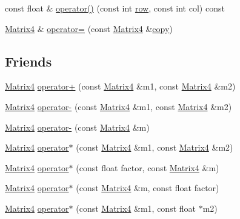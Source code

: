 \begin{DoxyCompactItemize}
\item 
const float \& \hyperlink{classprism_1_1_matrix4_a2e80dc870b4b71f06c8bb97ef7d22d90}{operator()} (const int \hyperlink{classprism_1_1_matrix4_a3915b1b0eae6e7bd4aefcec1dd3d863a}{row}, const int col) const 
\item 
\hyperlink{classprism_1_1_matrix4}{Matrix4} \& \hyperlink{classprism_1_1_matrix4_aa31f05b184217ef3ab902d6aa469500d}{operator=} (const \hyperlink{classprism_1_1_matrix4}{Matrix4} \&\hyperlink{namespaceprism_ae776f4cd825f79e7af1cf6ee1d90a209}{copy})
\end{DoxyCompactItemize}
\subsection*{Friends}
\begin{DoxyCompactItemize}
\item 
\hyperlink{classprism_1_1_matrix4}{Matrix4} \hyperlink{classprism_1_1_matrix4_afc2bce19b13471f0cac1a48c2932af60}{operator+} (const \hyperlink{classprism_1_1_matrix4}{Matrix4} \&m1, const \hyperlink{classprism_1_1_matrix4}{Matrix4} \&m2)
\item 
\hyperlink{classprism_1_1_matrix4}{Matrix4} \hyperlink{classprism_1_1_matrix4_a2e7720348e3d34cad4119b93c499971e}{operator-\/} (const \hyperlink{classprism_1_1_matrix4}{Matrix4} \&m1, const \hyperlink{classprism_1_1_matrix4}{Matrix4} \&m2)
\item 
\hyperlink{classprism_1_1_matrix4}{Matrix4} \hyperlink{classprism_1_1_matrix4_a9d189e964a989207c8489e80276dadd4}{operator-\/} (const \hyperlink{classprism_1_1_matrix4}{Matrix4} \&m)
\item 
\hyperlink{classprism_1_1_matrix4}{Matrix4} \hyperlink{classprism_1_1_matrix4_af33d4af5371e50d645cd647e02912f28}{operator$\ast$} (const \hyperlink{classprism_1_1_matrix4}{Matrix4} \&m1, const \hyperlink{classprism_1_1_matrix4}{Matrix4} \&m2)
\item 
\hyperlink{classprism_1_1_matrix4}{Matrix4} \hyperlink{classprism_1_1_matrix4_aefe58d9157e2f7ac266b357a5db4e986}{operator$\ast$} (const float factor, const \hyperlink{classprism_1_1_matrix4}{Matrix4} \&m)
\item 
\hyperlink{classprism_1_1_matrix4}{Matrix4} \hyperlink{classprism_1_1_matrix4_aeec24c93fae98db6ade9c1dd738ef3e7}{operator$\ast$} (const \hyperlink{classprism_1_1_matrix4}{Matrix4} \&m, const float factor)
\item 
\hyperlink{classprism_1_1_matrix4}{Matrix4} \hyperlink{classprism_1_1_matrix4_a023b29b55ee669aa94f8bbc9131923ce}{operator$\ast$} (const \hyperlink{classprism_1_1_matrix4}{Matrix4} \&m1, const float $\ast$m2)

\end{DoxyCompactItemize}
